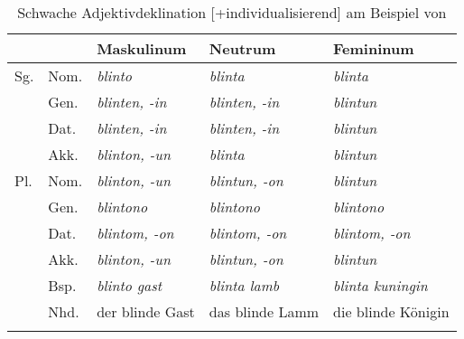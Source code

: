 \begin{table}

\begin{tabular}{lllll}
\lsptoprule
                  &               & \multicolumn{1}{l}{{Maskulinum}}  & \multicolumn{1}{l}{{Neutrum}}     & \multicolumn{1}{l}{{Femininum}}       \\ \midrule
{Sg.} & {Nom.} & \textit{blinto}                          & \textit{blinta}                          & \textit{blinta}                              \\
                  & {Gen.} & \textit{blinten, -in}                    & \textit{blinten, -in}                    & \textit{blintun}                             \\
                  & {Dat.} & \textit{blinten, -in}                    & \textit{blinten, -in}                    & \textit{blintun}                             \\
                  & {Akk.} & \textit{blinton, -un}                    & \textit{blinta}                          & \textit{blintun}                             \\
{Pl.}   & {Nom.} & \textit{blinton, -un}                    & \textit{blintun, -on}                    & \textit{blintun}                             \\
                  & {Gen.} & \textit{blintono}                        & \textit{blintono}                        & \textit{blintono}                            \\
                  & {Dat.} & \textit{blintom, -on}                    & \textit{blintom, -on}                    & \textit{blintom, -on}                        \\
                  & {Akk.} & \textit{blinton, -un}                    & \textit{blintun, -on}                    & \textit{blintun}                             \\\midrule
                  & {Bsp.} & \multicolumn{1}{l}{\textit{blinto gast}} & \multicolumn{1}{l}{\textit{blinta lamb}} & \multicolumn{1}{l}{\textit{blinta kuningin}} \\
                  & {Nhd.}          & \multicolumn{1}{l}{der blinde Gast}      & \multicolumn{1}{l}{das blinde Lamm}      & \multicolumn{1}{l}{die blinde Königin}       \\ \lspbottomrule
\end{tabular}
\caption{Schwache Adjektivdeklination [+individualisierend] am Beispiel von   \parencite[226]{Braune2004}}
\label{tab:schwach-adj}
\end{table}

